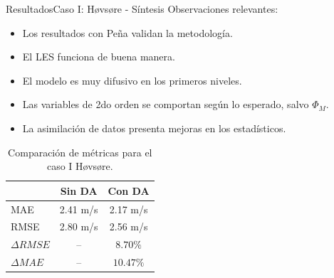 \documentclass[mathserif,10pt]{beamer}
\begin{document}
\begin{frame}{Resultados}{Caso I: Høvsøre - Síntesis}
		Observaciones relevantes:
		\begin{itemize}
			\item Los resultados con Peña validan la metodología.
			\item El LES funciona de buena manera.
			\item El modelo es muy difusivo en los primeros niveles.
			\item Las variables de 2do orden se comportan según lo esperado, salvo $\Phi_M$.
			\item La asimilación de datos presenta mejoras en los estadísticos.
		\end{itemize}
		\begin{table}[H]
			\caption{Comparación de métricas para el caso I Høvsøre.}
			\label{tab:06_hov_mae_rmse}
			\centering%
			\begin{tabular}{lcc}
				\toprule
				& Sin DA & Con DA \\
				\midrule
				MAE & 2.41 m/s & 2.17 m/s \\
				RMSE & 2.80 m/s& 2.56 m/s\\
				$\Delta{RMSE}$& --  & $8.70\%$  \\
				$\Delta{MAE}$ & -- & $10.47\%$  \\
				\bottomrule
			\end{tabular}
		\end{table}
\end{frame}
\end{document}
